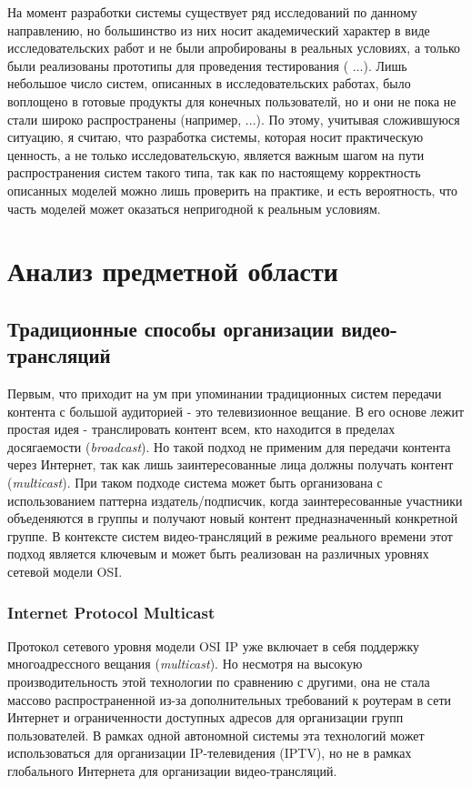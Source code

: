 	На момент разработки системы существует ряд исследований по данному направлению, но большинство из них носит
	академический характер в виде исследовательских работ и не были апробированы в реальных условиях, а только были
	реализованы прототипы для проведения тестирования ({\color{red} ...}). Лишь небольшое число систем, описанных в
	исследовательских работах, было воплощено в готовые продукты для конечных пользователй, но и они не пока не стали
	широко распространены (например, {\color{red} ...}). По этому, учитывая сложившуюся ситуацию, я считаю, что
	разработка системы, которая носит практическую ценность, а не только исследовательскую, является важным шагом на
	пути распространения систем такого типа, так как по настоящему корректность описанных моделей можно лишь проверить
	на практике, и есть вероятность, что часть моделей может оказаться непригодной к реальным условиям.

\section{Анализ предметной области}

	\subsection{Традиционные способы организации видео-трансляций}
	Первым, что приходит на ум при упоминании традиционных систем передачи контента с большой аудиторией - это
	телевизионное вещание. В его основе лежит простая идея - транслировать контент всем, кто находится в пределах
	досягаемости (\textit{broadcast}). Но такой подход не применим для передачи контента через Интернет, так как лишь
	заинтересованные лица должны получать контент (\textit{multicast}). При таком подходе система может быть
	организована с использованием паттерна издатель/подписчик, когда заинтересованные участники объеденяются в группы и
	получают новый контент предназначенный конкретной группе. В контексте систем видео-трансляций в режиме реального
	времени этот подход является ключевым и может быть реализован на различных уровнях сетевой модели OSI.

		\subsubsection{Internet Protocol Multicast}
		Протокол сетевого уровня модели OSI IP уже включает в себя поддержку многоадрессного вещания
		(\textit{multicast}). Но несмотря на высокую производительность этой технологии по сравнению с другими, она не
		стала массово распространенной из-за дополнительных требований к роутерам в сети Интернет и ограниченности
		доступных адресов для организации групп пользователей. В рамках одной автономной системы эта технологий может
		использоваться для организации IP-телевидения (IPTV), но не в рамках глобального Интернета для организации
		видео-трансляций.

